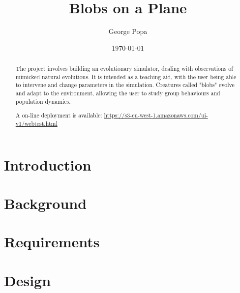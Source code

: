 \documentclass{l4proj}
\begin{document}
\title{Blobs on a Plane}

\author{George Popa}

\date{\today}
\maketitle
\begin{abstract}

The project involves building an evolutionary simulator, dealing with observations of mimicked natural evolutions. It is intended as a teaching aid, with the user being able to intervene and change parameters in the simulation. Creatures called "blobs" evolve and adapt to the environment, allowing the user to study group behaviours and population dynamics.

A on-line deployment is available: \url{https://s3-eu-west-1.amazonaws.com/ui-v1/webtest.html}

\end{abstract}

\tableofcontents


\chapter{Introduction}
\label{introduction}



\chapter{Background}
\label{background}



\chapter{Requirements}
\label{requirements}



\chapter{Design}
\label{design}

\end{document}
